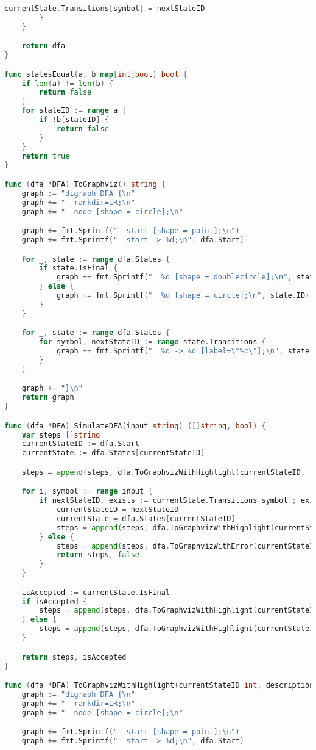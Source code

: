 \begin{lstlisting}[language=Go, caption={Код модуля \textit{dfa}}]
			currentState.Transitions[symbol] = nextStateID
		}
	}

	return dfa
}

func statesEqual(a, b map[int]bool) bool {
	if len(a) != len(b) {
		return false
	}
	for stateID := range a {
		if !b[stateID] {
			return false
		}
	}
	return true
}

func (dfa *DFA) ToGraphviz() string {
	graph := "digraph DFA {\n"
	graph += "  rankdir=LR;\n"
	graph += "  node [shape = circle];\n"

	graph += fmt.Sprintf("  start [shape = point];\n")
	graph += fmt.Sprintf("  start -> %d;\n", dfa.Start)

	for _, state := range dfa.States {
		if state.IsFinal {
			graph += fmt.Sprintf("  %d [shape = doublecircle];\n", state.ID)
		} else {
			graph += fmt.Sprintf("  %d [shape = circle];\n", state.ID)
		}
	}

	for _, state := range dfa.States {
		for symbol, nextStateID := range state.Transitions {
			graph += fmt.Sprintf("  %d -> %d [label=\"%c\"];\n", state.ID, nextStateID, symbol)
		}
	}

	graph += "}\n"
	return graph
}

func (dfa *DFA) SimulateDFA(input string) ([]string, bool) {
	var steps []string
	currentStateID := dfa.Start
	currentState := dfa.States[currentStateID]

	steps = append(steps, dfa.ToGraphvizWithHighlight(currentStateID, "Начало"))

	for i, symbol := range input {
		if nextStateID, exists := currentState.Transitions[symbol]; exists {
			currentStateID = nextStateID
			currentState = dfa.States[currentStateID]
			steps = append(steps, dfa.ToGraphvizWithHighlight(currentStateID, fmt.Sprintf("Шаг %d -- символ '%c'", i+1, symbol)))
		} else {
			steps = append(steps, dfa.ToGraphvizWithError(currentStateID, symbol))
			return steps, false
		}
	}

	isAccepted := currentState.IsFinal
	if isAccepted {
		steps = append(steps, dfa.ToGraphvizWithHighlight(currentStateID, "Допускается"))
	} else {
		steps = append(steps, dfa.ToGraphvizWithHighlight(currentStateID, "НЕ допускается"))
	}

	return steps, isAccepted
}

func (dfa *DFA) ToGraphvizWithHighlight(currentStateID int, description string) string {
	graph := "digraph DFA {\n"
	graph += "  rankdir=LR;\n"
	graph += "  node [shape = circle];\n"

	graph += fmt.Sprintf("  start [shape = point];\n")
	graph += fmt.Sprintf("  start -> %d;\n", dfa.Start)


\end{lstlisting}
